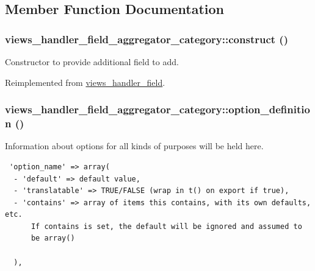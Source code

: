 \subsection{Member Function Documentation}
\hypertarget{classviews__handler__field__aggregator__category_d85fc06aa0e07281e3989dee8bd0c975}{
\subsubsection[{construct}]{\setlength{\rightskip}{0pt plus 5cm}views\_\-handler\_\-field\_\-aggregator\_\-category::construct ()}}
\label{classviews__handler__field__aggregator__category_d85fc06aa0e07281e3989dee8bd0c975}


Constructor to provide additional field to add. 

Reimplemented from \hyperlink{classviews__handler__field_3d50050864c255b71c842972a45d39f6}{views\_\-handler\_\-field}.\hypertarget{classviews__handler__field__aggregator__category_ff9a96fdcd4350cbe9323a9801996016}{
\subsubsection[{option\_\-definition}]{\setlength{\rightskip}{0pt plus 5cm}views\_\-handler\_\-field\_\-aggregator\_\-category::option\_\-definition ()}}
\label{classviews__handler__field__aggregator__category_ff9a96fdcd4350cbe9323a9801996016}


Information about options for all kinds of purposes will be held here. 

\begin{Code}\begin{verbatim} 'option_name' => array(
  - 'default' => default value,
  - 'translatable' => TRUE/FALSE (wrap in t() on export if true),
  - 'contains' => array of items this contains, with its own defaults, etc.
      If contains is set, the default will be ignored and assumed to
      be array()

  ),
\end{verbatim}
\end{Code}

